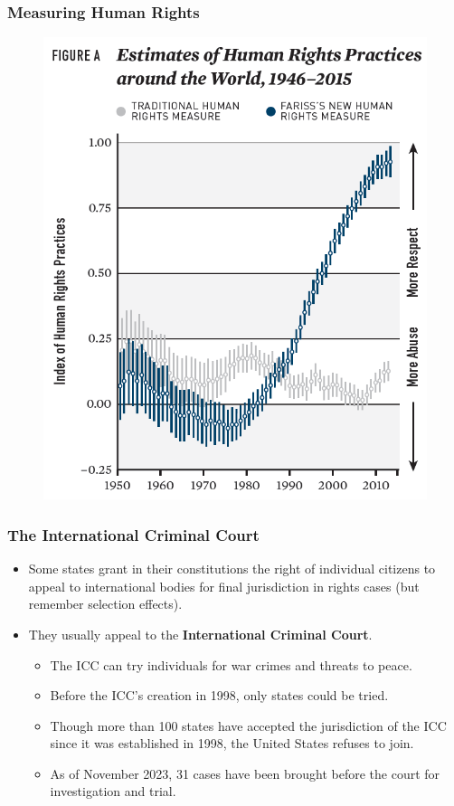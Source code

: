 \documentclass[handout]{beamer}
\begin{document}
\begin{frame} 
	\frametitle{\LARGE{Measuring Human Rights}}
	\begin{figure}[ht!]
		\centering
		\includegraphics[width=\textwidth,height=0.9\textheight,keepaspectratio]{./farriss.png}
	\end{figure}
\end{frame}


\begin{frame} 
	\frametitle{\LARGE{The International Criminal Court}}
	\begin{itemize}
		\item Some states grant in their constitutions the right of individual citizens to appeal to international bodies for final jurisdiction in rights cases (but remember selection effects). 
		\item They usually appeal to the \textbf{International Criminal Court}.
		\begin{itemize}
			\item The ICC can try individuals for war crimes and threats to peace.
			\item Before the ICC’s creation in 1998, only states could be tried.
			\item Though more than 100 states have accepted the jurisdiction of the ICC since it was established in 1998, the United States refuses to join. 
			\item As of November 2023, 31 cases have been brought before the court for investigation and trial.
		\end{itemize}
	\end{itemize}
\end{frame}
\end{document}
